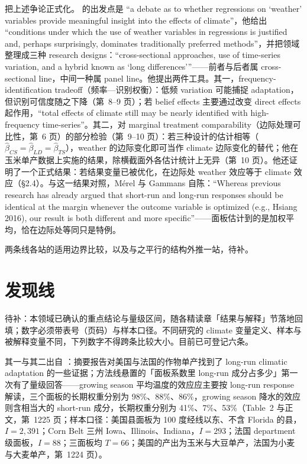 把上述争论正式化。\citet{hsiang2016climate} 的出发点是 ``a debate as to whether regressions on `weather' variables provide meaningful insight into the effects of climate''\citep[第~2 页]{hsiang2016climate}，他给出 ``conditions under which the use of weather variables in regressions is justified and, perhaps surprisingly, dominates traditionally preferred methods''\citep[第~2 页]{hsiang2016climate}，并把领域整理成三种 research designs：``cross-sectional approaches, use of time-series variation, and a hybrid known as `long differences'''\citep[第~5 页]{hsiang2016climate}——前者与后者属 cross-sectional line，中间一种属 panel line。他提出两件工具。其一，frequency-identification tradeoff（频率—识别权衡）：低频 variation 可能捕捉 adaptation，但识别可信度随之下降（第~8--9 页）；若 belief effects 主要通过改变 direct effects 起作用，``total effects of climate still may be nearly identified with high-frequency time-series''\citep[第~9 页]{hsiang2016climate}。其二，对 marginal treatment comparability（边际处理可比性，第~6 页）的部分检验（第~9--10 页）：若三种设计的估计相等（$\hat\beta_{CS}=\hat\beta_{LD}=\hat\beta_{TS}$），weather 的边际变化即可当作 climate 边际变化的替代；他在玉米单产数据上实施的结果，除横截面外各估计统计上无异（第~10 页）。他还证明了一个正式结果：若结果变量已被优化，在边际处 weather 效应等于 climate 效应（\S 2.4）。与这一结果对照，Mérel 与 Gammans 自陈：``Whereas previous research has already argued that short-run and long-run responses should be identical at the margin whenever the outcome variable is optimized (e.g., Hsiang 2016), our result is both different and more specific''\citep[第~1217 页]{merel2021climate}——面板估计到的是加权平均，恰在边际处等同只是特例。

两条线各站的适用边界比较，以及与之平行的结构外推一站，待补。

\section{发现线}

待补：本领域已确认的重点结论与量级区间，随各精读章「结果与解释」节落地回填；数字必须带表号（页码）与样本口径。不同研究的 climate 变量定义、样本与被解释变量不同，下列数字不得跨条比较大小。目前已可登记六条。

其一与其二出自 ：摘要报告对美国与法国的作物单产找到了 long-run climatic adaptation 的一些证据；方法线悬置的「面板系数里 long-run 成分占多少」第一次有了量级回答——growing season 平均温度的效应应主要按 long-run response 解读，三个面板的长期权重分别为 98\%、88\%、86\%，growing season 降水的效应则含相当大的 short-run 成分，长期权重分别为 41\%、7\%、53\%（Table~2 与正文，第~1225 页；样本口径：美国县面板为 100 度经线以东、不含 Florida 的县，$I=2{,}391$；Corn Belt 三州 Iowa、Illinois、Indiana，$I=293$；法国 department 级面板，$I=88$；三面板均 $T=66$；美国的产出为玉米与大豆单产，法国为小麦与大麦单产，第~1224 页）。

